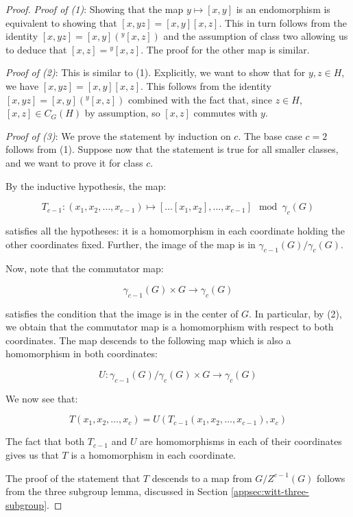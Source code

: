 \begin{proof}
  {\em Proof of (1)}: Showing that the map $y \mapsto [x,y]$ is an
  endomorphism is equivalent to showing that $[x,yz] =
  [x,y][x,z]$. This in turn follows from the identity $[x,yz] =
  [x,y]({}^y[x,z])$ and the assumption of class two allowing us to
  deduce that $[x,z] = {}^y[x,z]$. The proof for the other map is
  similar.

  {\em Proof of (2)}: This is similar to (1). Explicitly, we want to
  show that for $y,z \in H$, we have $[x,yz] = [x,y][x,z]$. This
  follows from the identity $[x,yz] = [x,y]({}^y[x,z])$ combined with
  the fact that, since $z \in H$, $[x,z] \in C_G(H)$ by assumption, so
  $[x,z]$ commutes with $y$.

  {\em Proof of (3)}: We prove the statement by induction on $c$. The
  base case $c = 2$ follows from (1). Suppose now that the statement
  is true for all smaller classes, and we want to prove it for class
  $c$.

  By the inductive hypothesis, the map:

  $$T_{c-1}: (x_1,x_2,\dots,x_{c-1}) \mapsto [ \dots [x_1,x_2],\dots,x_{c-1}] \mod \gamma_c(G)$$

  satisfies all the hypotheses: it is a homomorphism in each
  coordinate holding the other coordinates fixed. Further, the image
  of the map is in $\gamma_{c-1}(G)/\gamma_c(G)$.

  Now, note that the commutator map:

  $$\gamma_{c-1}(G) \times G \to \gamma_c(G)$$

  satisfies the condition that the image is in the center of $G$. In
  particular, by (2), we obtain that the commutator map is a
  homomorphism with respect to both coordinates. The map descends to
  the following map which is also a homomorphism in both coordinates:

  $$U: \gamma_{c-1}(G)/\gamma_c(G) \times G \to \gamma_c(G)$$

  We now see that:

  $$T(x_1,x_2,\dots,x_c) = U(T_{c-1}(x_1,x_2,\dots,x_{c-1}),x_c)$$

  The fact that both $T_{c-1}$ and $U$ are homomorphisms in each of
  their coordinates gives us that $T$ is a homomorphism in each
  coordinate.

  The proof of the statement that $T$ descends to a map from
  $G/Z^{c-1}(G)$ follows from the three subgroup lemma, discussed in
  Section \ref{appsec:witt-three-subgroup}.
\end{proof}

